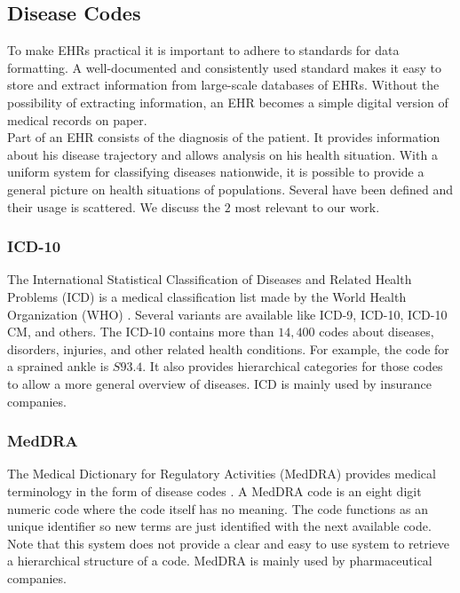 \subsection{Disease Codes}

To make EHRs practical it is important to adhere to standards for data formatting. A well-documented and consistently used standard makes it easy to store and extract information from large-scale databases of EHRs. Without the possibility of extracting information, an EHR becomes a simple digital version of medical records on paper. \\
Part of an EHR consists of the diagnosis of the patient. It provides information about his disease trajectory and allows analysis on his health situation. With a uniform system for classifying diseases nationwide, it is possible to provide a general picture on health situations of populations. Several have been defined and their usage is scattered. We discuss the $2$ most relevant to our work.

\subsubsection{ICD-10}

The International Statistical Classification of Diseases and Related Health Problems (ICD) is a medical classification list made by the World Health Organization (WHO) \cite{WHO_ICD:online}. Several variants are available like ICD-9, ICD-10, ICD-10 CM, and others. The ICD-10 contains more than $14,400$ codes about diseases, disorders, injuries, and other related health conditions. For example, the code for a sprained ankle is $S93.4$. It also provides hierarchical categories for those codes to allow a more general overview of diseases. ICD is mainly used by insurance companies.


\subsubsection{MedDRA}

The Medical Dictionary for Regulatory Activities (MedDRA) provides medical terminology in the form of disease codes \cite{MedDRA:online}. A MedDRA code is an eight digit numeric code where the code itself has no meaning. The code functions as an unique identifier so new terms are just identified with the next available code. Note that this system does not provide a clear and easy to use system to retrieve a hierarchical structure of a code. MedDRA is mainly used by pharmaceutical companies.

